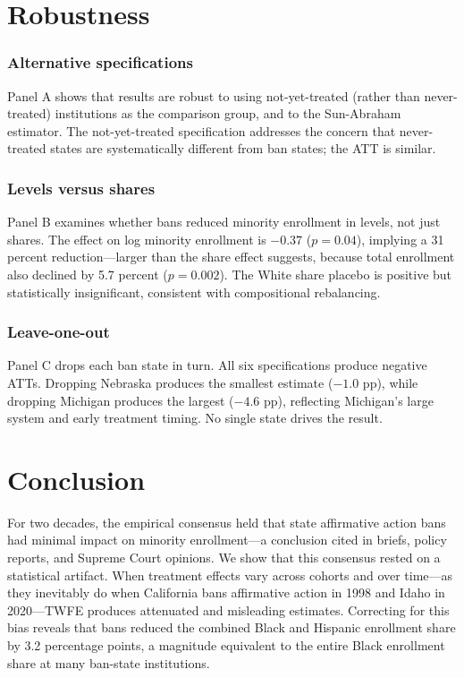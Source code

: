 \documentclass[12pt]{article}
\begin{document}



\section{Robustness}
\label{sec:robustness}

\subsubsection*{Alternative specifications}  Panel A shows that results are robust to using not-yet-treated (rather than never-treated) institutions as the comparison group, and to the Sun-Abraham estimator. The not-yet-treated specification addresses the concern that never-treated states are systematically different from ban states; the ATT is similar.

\subsubsection*{Levels versus shares} Panel B examines whether bans reduced minority enrollment in levels, not just shares. The effect on log minority enrollment is $-0.37$ ($p = 0.04$), implying a 31 percent reduction---larger than the share effect suggests, because total enrollment also declined by 5.7 percent ($p = 0.002$). The White share placebo is positive but statistically insignificant, consistent with compositional rebalancing.

\subsubsection*{Leave-one-out} Panel C drops each ban state in turn. All six specifications produce negative ATTs. Dropping Nebraska produces the smallest estimate ($-1.0$ pp), while dropping Michigan produces the largest ($-4.6$ pp), reflecting Michigan's large system and early treatment timing. No single state drives the result.




\section{Conclusion}
\label{sec:conclusion}

For two decades, the empirical consensus held that state affirmative action bans had minimal impact on minority enrollment---a conclusion cited in briefs, policy reports, and Supreme Court opinions. We show that this consensus rested on a statistical artifact. When treatment effects vary across cohorts and over time---as they inevitably do when California bans affirmative action in 1998 and Idaho in 2020---TWFE produces attenuated and misleading estimates. Correcting for this bias reveals that bans reduced the combined Black and Hispanic enrollment share by 3.2 percentage points, a magnitude equivalent to the entire Black enrollment share at many ban-state institutions.
\end{document}
